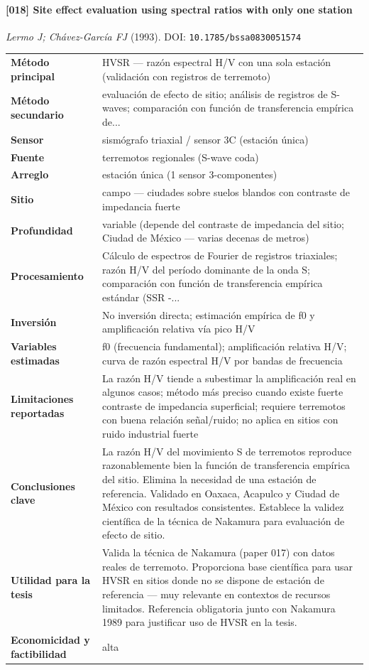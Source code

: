 \paragraph{[018] Site effect evaluation using spectral ratios with only one station} \emph{Lermo J; Chávez-García FJ} (1993).
{\scriptsize DOI: \texttt{10.1785/bssa0830051574}}

\begin{center}\scriptsize
\begin{tabularx}{\textwidth}{@{}>{\bfseries}p{3.3cm} X@{}}
\toprule
M\'etodo principal & HVSR --- razón espectral H/V con una sola estación (validación con registros de terremoto) \\
M\'etodo secundario & evaluación de efecto de sitio; análisis de registros de S-waves; comparación con función de transferencia empírica de... \\
Sensor & sismógrafo triaxial / sensor 3C (estación única) \\
Fuente & terremotos regionales (S-wave coda) \\
Arreglo & estación única (1 sensor 3-componentes) \\
Sitio & campo --- ciudades sobre suelos blandos con contraste de impedancia fuerte \\
Profundidad & variable (depende del contraste de impedancia del sitio; Ciudad de México --- varias decenas de metros) \\
Procesamiento & Cálculo de espectros de Fourier de registros triaxiales; razón H/V del período dominante de la onda S; comparación con función de transferencia empírica estándar (SSR -... \\
Inversi\'on & No inversión directa; estimación empírica de f0 y amplificación relativa vía pico H/V \\
Variables estimadas & f0 (frecuencia fundamental); amplificación relativa H/V; curva de razón espectral H/V por bandas de frecuencia \\
Limitaciones reportadas & La razón H/V tiende a subestimar la amplificación real en algunos casos; método más preciso cuando existe fuerte contraste de impedancia superficial; requiere terremotos con buena relación señal/ruido; no aplica en sitios con ruido industrial fuerte \\
Conclusiones clave & La razón H/V del movimiento S de terremotos reproduce razonablemente bien la función de transferencia empírica del sitio. Elimina la necesidad de una estación de referencia. Validado en Oaxaca, Acapulco y Ciudad de México con resultados consistentes. Establece la validez científica de la técnica de Nakamura para evaluación de efecto de sitio. \\
Utilidad para la tesis & Valida la técnica de Nakamura (paper 017) con datos reales de terremoto. Proporciona base científica para usar HVSR en sitios donde no se dispone de estación de referencia --- muy relevante en contextos de recursos limitados. Referencia obligatoria junto con Nakamura 1989 para justificar uso de HVSR en la tesis. \\
Economicidad y factibilidad & alta \\
\bottomrule
\end{tabularx}
\end{center}

